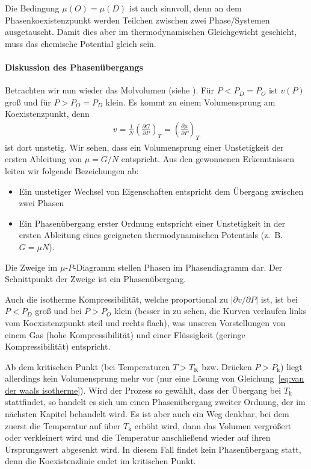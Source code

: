 Die Bedingung $\mu(O)=\mu(D)$ ist auch sinnvoll, denn an dem Phasenkoexistenzpunkt werden Teilchen zwischen zwei Phase/Systemen ausgetauscht. Damit dies aber im thermodynamischen Gleichgewicht geschieht, muss das chemische Potential gleich sein.


\paragraph*{Diskussion des Phasenübergangs}

Betrachten wir nun wieder das Molvolumen (siehe ). Für $P<P_D=P_O$ ist $v(P)$ groß und für $P>P_O=P_D$ klein. Es kommt zu einem Volumensprung am Koexistenzpunkt, denn
\begin{align*}
    v=\frac{1}{N}\left( \frac{\partial G}{\partial P} \right)_T =\left( \frac{\partial \mu}{\partial P} \right)_T
\end{align*}
ist dort unstetig. Wir sehen, dass ein Volumensprung einer Unstetigkeit der ersten Ableitung von $\mu=G/N$ entspricht. Aus den gewonnenen Erkenntnissen leiten wir folgende Bezeichungen ab:
\begin{itemize}
    \item Ein unstetiger Wechsel von Eigenschaften entspricht dem Übergang zwischen zwei Phasen
    \item Ein Phasenübergang erster Ordnung entspricht einer Unstetigkeit in der ersten Ableitung eines geeigneten thermodynamischen Potentials (z.~B. $G=\mu N$).
\end{itemize}

Die Zweige im $\mu$-$P$-Diagramm stellen Phasen im Phasendiagramm dar. Der Schnittpunkt der Zweige ist ein Phasenübergang.

Auch die isotherme Kompressibilität, welche proportional zu $|\partial v/\partial P|$ ist, ist bei $P<P_D$ groß und bei $P>P_O$ klein (besser in  zu sehen, die Kurven verlaufen links vom Koexistenzpunkt steil und rechts flach), was unseren Vorstellungen von einem Gas (hohe Kompressibilität) und einer Flüssigkeit (geringe Kompressibilität) entspricht.


Ab dem kritischen Punkt (bei Temperaturen $T>T_\mathrm{K}$ bzw. Drücken $P>P_\mathrm{k}$) liegt allerdings kein Volumensprung mehr vor (nur eine Lösung von Gleichung~\eqref{eq:van der waals isotherme}). Wird der Prozess so gewählt, dass der Übergang bei $T_\mathrm{k}$ stattfindet, so handelt es sich um einen Phasenübergang zweiter Ordnung, der im nächsten Kapitel behandelt wird. Es ist aber auch ein Weg denkbar, bei dem zuerst die Temperatur auf über $T_\mathrm{k}$ erhöht wird, dann das Volumen vergrößert oder verkleinert wird und die Temperatur anschließend wieder auf ihren Ursprungswert abgesenkt wird. In diesem Fall findet kein Phasenübergang statt, denn die Koexistenzlinie endet im kritischen Punkt.


